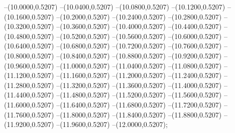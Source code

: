 {	--(10.0000,0.5207)
	--(10.0400,0.5207)
	--(10.0800,0.5207)
	--(10.1200,0.5207)
	--(10.1600,0.5207)
	--(10.2000,0.5207)
	--(10.2400,0.5207)
	--(10.2800,0.5207)
	--(10.3200,0.5207)
	--(10.3600,0.5207)
	--(10.4000,0.5207)
	--(10.4400,0.5207)
	--(10.4800,0.5207)
	--(10.5200,0.5207)
	--(10.5600,0.5207)
	--(10.6000,0.5207)
	--(10.6400,0.5207)
	--(10.6800,0.5207)
	--(10.7200,0.5207)
	--(10.7600,0.5207)
	--(10.8000,0.5207)
	--(10.8400,0.5207)
	--(10.8800,0.5207)
	--(10.9200,0.5207)
	--(10.9600,0.5207)
	--(11.0000,0.5207)
	--(11.0400,0.5207)
	--(11.0800,0.5207)
	--(11.1200,0.5207)
	--(11.1600,0.5207)
	--(11.2000,0.5207)
	--(11.2400,0.5207)
	--(11.2800,0.5207)
	--(11.3200,0.5207)
	--(11.3600,0.5207)
	--(11.4000,0.5207)
	--(11.4400,0.5207)
	--(11.4800,0.5207)
	--(11.5200,0.5207)
	--(11.5600,0.5207)
	--(11.6000,0.5207)
	--(11.6400,0.5207)
	--(11.6800,0.5207)
	--(11.7200,0.5207)
	--(11.7600,0.5207)
	--(11.8000,0.5207)
	--(11.8400,0.5207)
	--(11.8800,0.5207)
	--(11.9200,0.5207)
	--(11.9600,0.5207)
	--(12.0000,0.5207);
}
